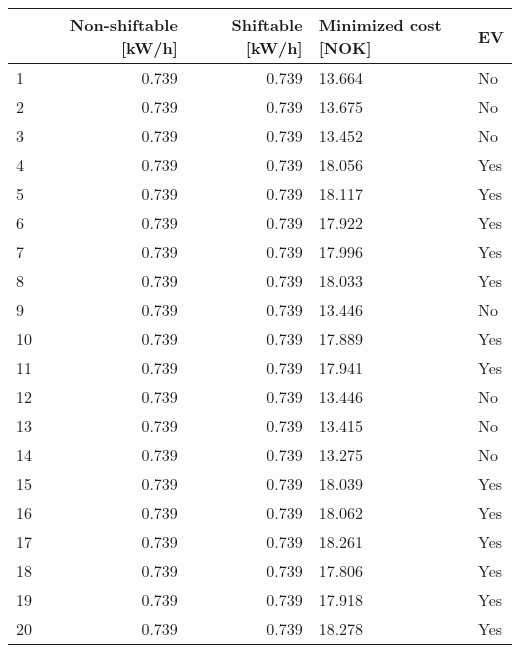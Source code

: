 \begin{tabular}{lrrll}
\toprule
{} &  Non-shiftable [kW/h] &  Shiftable [kW/h] & Minimized cost [NOK] &   EV \\
\midrule
1  &                 0.739 &             0.739 &               13.664 &   No \\
2  &                 0.739 &             0.739 &               13.675 &   No \\
3  &                 0.739 &             0.739 &               13.452 &   No \\
4  &                 0.739 &             0.739 &               18.056 &  Yes \\
5  &                 0.739 &             0.739 &               18.117 &  Yes \\
6  &                 0.739 &             0.739 &               17.922 &  Yes \\
7  &                 0.739 &             0.739 &               17.996 &  Yes \\
8  &                 0.739 &             0.739 &               18.033 &  Yes \\
9  &                 0.739 &             0.739 &               13.446 &   No \\
10 &                 0.739 &             0.739 &               17.889 &  Yes \\
11 &                 0.739 &             0.739 &               17.941 &  Yes \\
12 &                 0.739 &             0.739 &               13.446 &   No \\
13 &                 0.739 &             0.739 &               13.415 &   No \\
14 &                 0.739 &             0.739 &               13.275 &   No \\
15 &                 0.739 &             0.739 &               18.039 &  Yes \\
16 &                 0.739 &             0.739 &               18.062 &  Yes \\
17 &                 0.739 &             0.739 &               18.261 &  Yes \\
18 &                 0.739 &             0.739 &               17.806 &  Yes \\
19 &                 0.739 &             0.739 &               17.918 &  Yes \\
20 &                 0.739 &             0.739 &               18.278 &  Yes \\

\end{tabular}

